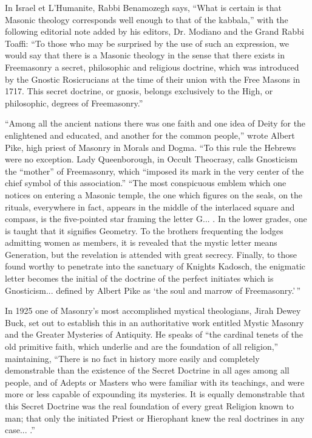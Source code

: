 In Israel et L'Humanite, Rabbi Benamozegh says, ``What is certain is that Masonic theology corresponds well enough to that of the kabbala,'' with the following editorial note added by his editors, Dr. Modiano and the Grand Rabbi Toaffi: ``To those who may be surprised by the use of such an expression, we would say that there is a Masonic theology in the sense that there exists in Freemasonry a secret, philosophic and religious doctrine, which was introduced by the Gnostic Rosicrucians at the time of their union with the Free Masons in 1717. This secret doctrine, or gnosis, belongs exclusively to the High, or philosophic, degrees of Freemasonry.''

``Among all the ancient nations there was one faith and one idea of Deity for the enlightened and educated, and another for the common people,'' wrote Albert Pike, high priest of Masonry in Morals and Dogma. ``To this rule the Hebrews were no exception. Lady Queenborough, in Occult Theocrasy, calls Gnosticism the ``mother'' of Freemasonry, which ``imposed its mark in the very center of the chief symbol of this association.'' ``The most conspicuous emblem which one notices on entering a Masonic temple, the one which figures on the seals, on the rituals, everywhere in fact, appears in the middle of the interlaced square and compass, is the five-pointed star framing the letter G... . In the lower grades, one is taught that it signifies Geometry. To the brothers frequenting the lodges admitting women as members, it is revealed that the mystic letter means Generation, but the revelation is attended with great secrecy. Finally, to those found worthy to penetrate into the sanctuary of Knights Kadosch, the enigmatic letter becomes the initial of the doctrine of the perfect initiates which is Gnosticism... defined by Albert Pike as `the soul and marrow of Freemasonry.'\,''

In 1925 one of Masonry's most accomplished mystical theologians, Jirah Dewey Buck, set out to establish this in an authoritative work entitled Mystic Masonry and the Greater Mysteries of Antiquity. He speaks of ``the cardinal tenets of the old primitive faith, which underlie and are the foundation of all religion,'' maintaining, ``There is no fact in history more easily and completely demonstrable than the existence of the Secret Doctrine in all ages among all people, and of Adepts or Masters who were familiar with its teachings, and were more or less capable of expounding its mysteries. It is equally demonstrable that this Secret Doctrine was the real foundation of every great Religion known to man; that only the initiated Priest or Hierophant knew the real doctrines in any case... .''

